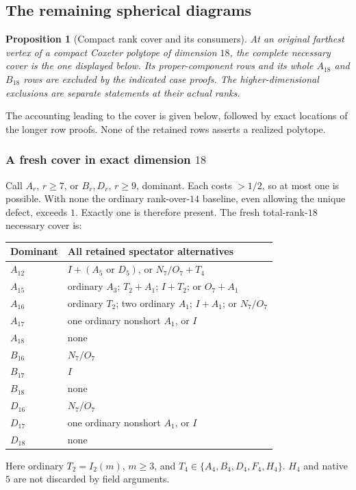 \documentclass[11pt]{article}
\newtheorem{proposition}[theorem]{Proposition}
\theoremstyle{remark}\newtheorem{remark}[theorem]{Remark}
\numberwithin{equation}{section}
\begin{document}
\subsection{The remaining spherical diagrams}
\label{compact:sec:forests}
\begin{proposition}[Compact rank cover and its consumers]
\label{prop:compactcover}
At an original farthest vertex of a compact Coxeter polytope of dimension
$18$, the complete necessary cover is the one displayed below. Its
proper-component rows and its whole $A_{18}$ and $B_{18}$ rows are
excluded by the indicated case proofs. The higher-dimensional exclusions
are separate statements at their actual ranks.
\end{proposition}
The accounting leading to the cover is given below, followed by exact
locations of the longer row proofs. None of the retained rows asserts a
realized polytope.

\subsubsection[A fresh cover in exact dimension 18]{A fresh cover in exact dimension \(18\)}
Call \(A_r\), \(r\geq7\), or \(B_r,D_r\), \(r\geq9\),
dominant. Each costs \(>1/2\), so at most one is possible.
With none the ordinary rank-over-\(14\) baseline, even allowing
the unique defect, exceeds \(1\). Exactly one is therefore present.
The fresh total-rank-\(18\) necessary cover is:
\begin{center}\small
\begin{tabular}{p{.14\linewidth}p{.75\linewidth}}
\toprule
Dominant&All retained spectator alternatives\\ \midrule
\(A_{12}\)&\(I+(A_5\text{ or }D_5)\), or \(N_7/O_7+T_4\)\\
\(A_{15}\)&ordinary \(A_3\); \(T_2+A_1\); \(I+T_2\); or \(O_7+A_1\)\\
\(A_{16}\)&ordinary \(T_2\); two ordinary \(A_1\); \(I+A_1\); or \(N_7/O_7\)\\
\(A_{17}\)&one ordinary nonshort \(A_1\), or \(I\)\\
\(A_{18}\)&none\\
\(B_{16}\)&\(N_7/O_7\)\\
\(B_{17}\)&\(I\)\\
\(B_{18}\)&none\\
\(D_{16}\)&\(N_7/O_7\)\\
\(D_{17}\)&one ordinary nonshort \(A_1\), or \(I\)\\
\(D_{18}\)&none\\ \bottomrule
\end{tabular}
\end{center}
Here ordinary \(T_2=I_2(m)\), \(m\geq3\), and
 \(T_4\in\{A_4,B_4,D_4,F_4,H_4\}\).
\(H_4\) and native \(5\) are not discarded by field arguments.
\end{document}
